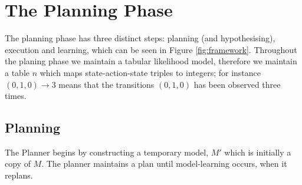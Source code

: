 \section{The Planning Phase}
The planning phase has three distinct steps: planning (and hypothesising), execution and learning, which can be seen in Figure \ref{fig:framework}. Throughout the planing phase we maintain a tabular likelihood model, therefore we maintain a table $n$ which maps state-action-state triples to integers; for instance $(0, 1, 0) \rightarrow 3$ means that the transitions $(0, 1, 0)$ has been observed three times.
\subsection{Planning}
The Planner begins by constructing a temporary model, $M'$ which is initially a copy of $M$. The planner maintains a plan until model-learning occurs, when it replans.
